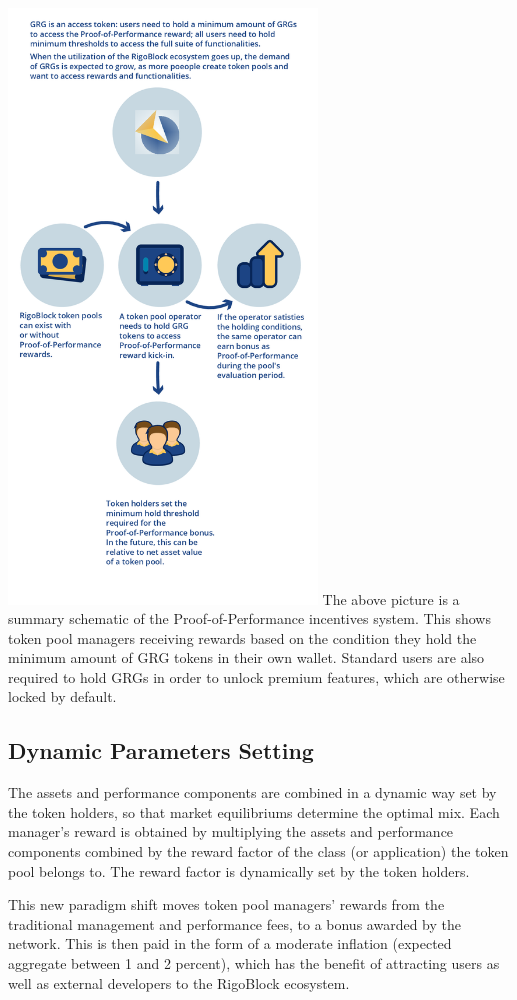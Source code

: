 \documentclass[9pt,oneside]{amsart}
\begin{document}
\begin{multicols}{2}
\includegraphics[width=8.2cm]{pop-tokenomics4.png}
The above picture is a summary schematic of the Proof-of-Performance incentives system. This shows token pool managers receiving rewards based on the condition they hold the minimum amount of GRG tokens in their own wallet. Standard users are also required to hold GRGs in order to unlock premium features, which are otherwise locked by default. 

\subsection{Dynamic Parameters Setting}
The assets and performance components are combined in a dynamic way set by the token holders, so that market equilibriums determine the optimal mix. Each manager’s reward is obtained by multiplying the assets and performance components combined by the reward factor of the class (or application) the token pool belongs to. The reward factor is dynamically set by the token holders. 

This new paradigm shift moves token pool managers’ rewards from the traditional management and performance fees, to a bonus awarded by the network. This is then paid in the form of a moderate inflation (expected aggregate between 1 and 2 percent), which has the benefit of attracting users as well as external developers to the RigoBlock ecosystem. 


\end{multicols}
\end{document}

